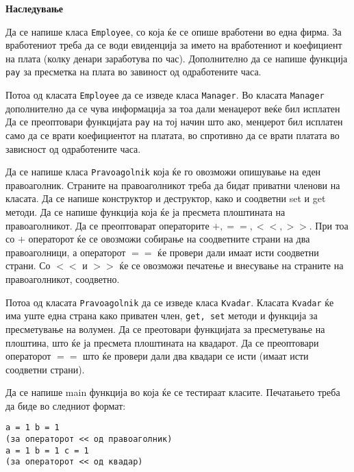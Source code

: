 \documentclass[12pt,a4paper]{exam}
\begin{document}
\pagestyle{headandfoot}
\headrule
{}
\begin{center}
\Large{\textbf{Наследување}}
\end{center}
\begin{questions}

\question
Да се напише класа \texttt{Employee}, со која ќе се опише вработени во една фирма. За
вработениот треба да се води евиденција за името на вработениот и коефициент на
плата (колку денари заработува по час). Дополнително да се напише функција \texttt{pay} за
пресметка на плата во завиност од одработените часа. 

Потоа од класата \texttt{Employee} да се
изведе класа \texttt{Manager}. Во класата \texttt{Manager} дополнително да се
чува информација за тоа дали менаџерот веќе бил исплатен  Да се преоптовари
функцијата \texttt{pay} на тој начин што ако, менџерот бил исплатен само да се
врати коефициентот на платата, во спротивно да се врати платата во зависност од
одработените часа.

\question
Да се напише класа \texttt{Pravoagolnik} која ќе го овозможи опишување на еден
правоаголник. Страните на правоаголникот треба да бидат приватни членови на
класата. Да се напише конструктор и деструктор, како и соодветни set и get
методи. Да се напише функција која ќе ја пресмета плоштината на правоаголникот.
Да се преоптоварат операторите $+, ==, <<, >>$. При тоа со $+$ операторот ќе се
овозможи собирање на соодветните страни на два правоаголници, а операторот $==$
ќе провери дали имаат исти соодветни страни. Со $<<$ и $>>$ ќе се овозможи
печатење и внесување на страните на правоаголникот, соодветно. 

Потоа од класата \texttt{Pravoagolnik} да се изведе класа \texttt{Kvadar}.
Класата \texttt{Kvadar} ќе има уште една страна како приватен член, \texttt{get,
set} методи и функција за пресметување на волумен. Да се преотовари функцијата
за пресметување на плоштина, што ќе ја пресмета плоштината на квадарот. Да се
преоптовари операторот $==$ што ќе провери дали два квадари се исти (имаат исти
соодветни страни). 

Да се напише main функција во која ќе се тестираат класите. Печатањето треба да
биде во следниот формат:
\begin{verbatim}
a = 1 b = 1
(за операторот << од правоаголник)
a = 1 b = 1 c = 1 
(за операторот << од квадар)
\end{verbatim} 


\end{questions}
\end{document}
